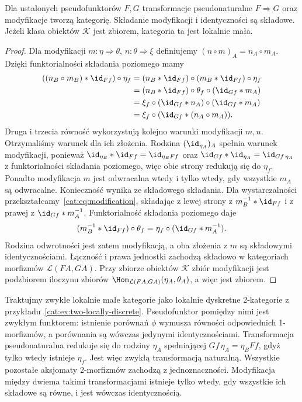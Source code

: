 \begin{stwierdzenie}\label{cat:prop:modification-category}
Dla ustalonych pseudofunktorów $F,G$ transformacje pseudonaturalne $F\Rightarrow G$ oraz modyfikacje tworzą kategorię. Składanie modyfikacji i identyczności są składowe. Jeżeli klasa obiektów $\mathcal K$ jest zbiorem, kategoria ta jest lokalnie mała.
\end{stwierdzenie}
\begin{proof}
Dla modyfikacji $m:\eta\Rightarrow\theta$, $n:\theta\Rightarrow\xi$ definiujemy $(n\circ m)_A=n_A\circ m_A$. Dzięki funktorialności składania poziomego mamy
\[
\begin{aligned}
 ((n_B\circ m_B)\ast\id_{Ff})\circ\eta_f
 &=(n_B\ast\id_{Ff})\circ(m_B\ast\id_{Ff})\circ\eta_f\\
 &=(n_B\ast\id_{Ff})\circ\theta_f
      \circ(\id_{Gf}\ast m_A)\\
 &=\xi_f\circ(\id_{Gf}\ast n_A)\circ(\id_{Gf}\ast m_A)\\
 &=\xi_f\circ(\id_{Gf}\ast(n_A\circ m_A)).
\end{aligned}
\]
Druga i trzecia równość wykorzystują kolejno warunki modyfikacji $m,n$. Otrzymaliśmy warunek dla ich złożenia. Rodzina $(\id_{\eta_A})_A$ spełnia warunek modyfikacji, ponieważ $\id_{\eta_B}\ast\id_{Ff}=\id_{\eta_B Ff}$ oraz $\id_{Gf}\ast\id_{\eta_A}=\id_{Gf\,\eta_A}$ z funktorialności składania poziomego, więc obie strony redukują się do $\eta_f$. Ponadto modyfikacja $m$ jest odwracalna wtedy i tylko wtedy, gdy wszystkie $m_A$ są odwracalne. Konieczność wynika ze składowego składania. Dla wystarczalności przekształcamy~\eqref{cat:eq:modification}, składając z lewej strony z $m_B^{-1}\ast\id_{Ff}$ i z prawej z $\id_{Gf}\ast m_A^{-1}$. Funktorialność składania poziomego daje
\[
 (m_B^{-1}\ast\id_{Ff})\circ\theta_f
 =\eta_f\circ(\id_{Gf}\ast m_A^{-1}).
\]
Rodzina odwrotności jest zatem modyfikacją, a oba złożenia z $m$ są składowymi identycznościami. Łączność i prawa jednostki zachodzą składowo w kategoriach morfizmów $\mathcal L(FA,GA)$. Przy zbiorze obiektów $\mathcal K$ zbiór modyfikacji jest podzbiorem iloczynu zbiorów $\Hom_{\mathcal L(FA,GA)}(\eta_A,\theta_A)$, a więc jest zbiorem.
\end{proof}

\begin{przyklad}\label{cat:ex:pseudonatural-discrete}
Traktujmy zwykłe lokalnie małe kategorie jako lokalnie dyskretne 2-kategorie z przykładu~\ref{cat:ex:two-locally-discrete}. Pseudofunktor pomiędzy nimi jest zwykłym funktorem: istnienie porównań $\phi$ wymusza równości odpowiednich 1-morfizmów, a porównania są wówczas jedynymi identycznościami. Transformacja pseudonaturalna redukuje się do rodziny $\eta_A$ spełniającej $Gf\,\eta_A=\eta_B Ff$, gdyż tylko wtedy istnieje $\eta_f$. Jest więc zwykłą transformacją naturalną. Wszystkie pozostałe aksjomaty 2-morfizmów zachodzą z jednoznaczności. Modyfikacja między dwiema takimi transformacjami istnieje tylko wtedy, gdy wszystkie ich składowe są równe, i jest wówczas identycznością.
\end{przyklad}


